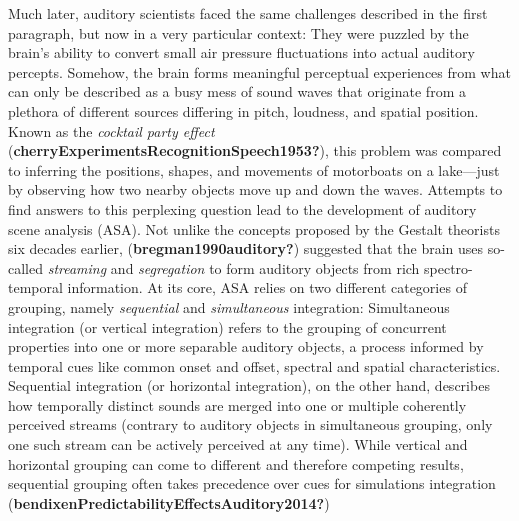 \documentclass[twoside, man, a4paper,12pt, nofontenc]{apa7}
\begin{document}
Much later, auditory scientists faced the same challenges described in
the first paragraph, but now in a very particular context: They were
puzzled by the brain's ability to convert small air pressure
fluctuations into actual auditory percepts. Somehow, the brain forms
meaningful perceptual experiences from what can only be described as a
busy mess of sound waves that originate from a plethora of different
sources differing in pitch, loudness, and spatial position. Known as the
\emph{cocktail party effect}
(\textbf{cherryExperimentsRecognitionSpeech1953?}), this problem was
compared to inferring the positions, shapes, and movements of motorboats
on a lake---just by observing how two nearby objects move up and down
the waves. Attempts to find answers to this perplexing question lead to
the development of auditory scene analysis (ASA). Not unlike the
concepts proposed by the Gestalt theorists six decades earlier,
(\textbf{bregman1990auditory?}) suggested that the brain uses so-called
\emph{streaming} and \emph{segregation} to form auditory objects from
rich spectro-temporal information. At its core, ASA relies on two
different categories of grouping, namely \emph{sequential} and
\emph{simultaneous} integration: Simultaneous integration (or vertical
integration) refers to the grouping of concurrent properties into one or
more separable auditory objects, a process informed by temporal cues
like common onset and offset, spectral and spatial characteristics.
Sequential integration (or horizontal integration), on the other hand,
describes how temporally distinct sounds are merged into one or multiple
coherently perceived streams (contrary to auditory objects in
simultaneous grouping, only one such stream can be actively perceived at
any time). While vertical and horizontal grouping can come to different
and therefore competing results, sequential grouping often takes
precedence over cues for simulations integration
(\textbf{bendixenPredictabilityEffectsAuditory2014?})
\end{document}
